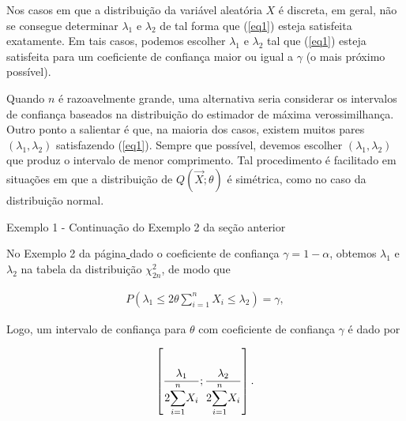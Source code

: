 \documentclass[12pt]{beamer}
\begin{document}
\begin{frame}{}
\begin{block}{}
\justifying
Nos casos em que a distribuição da variável aleatória $X$ é discreta, em geral, não se consegue determinar $\lambda_1$ e $\lambda_2$ de tal forma que (\ref{eq1}) esteja satisfeita exatamente. Em tais casos, podemos escolher $\lambda_1$ e $\lambda_2$ tal que (\ref{eq1}) esteja satisfeita para um coeficiente de confiança maior ou igual a $\gamma$ (o mais próximo possível).



\end{block}
\end{frame}

\begin{frame}{}
\begin{block}{}
\justifying
Quando $n$ é razoavelmente grande, uma alternativa seria considerar os intervalos de confiança baseados na distribuição do estimador de máxima verossimilhança. Outro ponto a salientar é que, na maioria dos casos, existem muitos pares $(\lambda_1, \lambda_2)$ satisfazendo (\ref{eq1}). Sempre que possível, devemos escolher $(\lambda_1, \lambda_2)$ que produz o intervalo de menor comprimento. Tal procedimento é facilitado em situações em que a distribuição de $Q(\Vec{X}; \theta)$ é simétrica, como no caso da distribuição normal.
\end{block}
\end{frame}

\begin{frame}{Exemplo 1 - Continuação do Exemplo 2 da seção anterior}
\begin{block}{}
\justifying
No Exemplo 2 da página\hyperlink{EX2}{ \pageref{EX2}} dado o coeficiente de confiança $\gamma = 1 - \alpha$, obtemos $\lambda_1$ e $\lambda_2$ na tabela da distribuição $\chi^2_{2n}$, de modo que

\begin{align}\label{eq5}
P\left(\lambda_1 \leq 2\theta\sum_{i=1}^{n} X_i \leq \lambda_2\right) = \gamma,
\end{align}
\end{block}
\end{frame}

\begin{frame}{}
\begin{block}{}
\justifying
Logo, um intervalo de confiança para $\theta$ com coeficiente de confiança $\gamma$ é dado por

\begin{align}\label{I6}
\left[ \frac{\lambda_1}{2{\displaystyle \sum_{i=1}^{n}} X_i} ; \frac{\lambda_2}{2{\displaystyle \sum_{i=1}^{n}} X_i} \right].
\end{align}
\end{block}
\end{frame}
\end{document}
